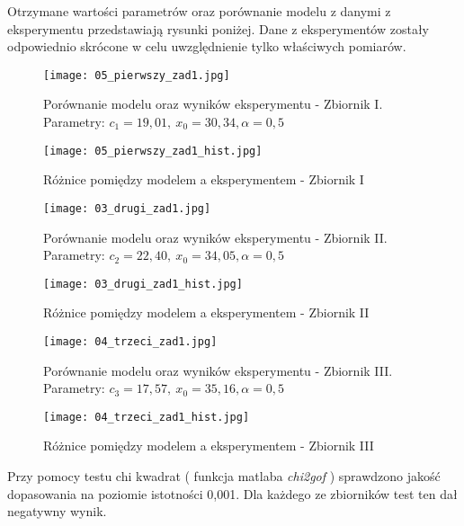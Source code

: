 \documentclass[a4paper,15pt]{article}
\begin{document}
Otrzymane wartości parametrów oraz porównanie modelu z danymi z eksperymentu przedstawiają rysunki poniżej. Dane z eksperymentów zostały odpowiednio skrócone w celu uwzględnienie tylko właściwych pomiarów.

\begin{figure}[H]
\centerline{\texttt{[image: 05\_pierwszy\_zad1.jpg]}}
\centering
\caption{Porównanie modelu oraz wyników eksperymentu - Zbiornik I. Parametry:
\( c_1 = 19,01, \ x_0 = 30,34, \alpha = 0,5 \)}
\label{fig:05_pierwszy_zad1}
\end{figure}

\begin{figure}[H]
\centerline{\texttt{[image: 05\_pierwszy\_zad1\_hist.jpg]}}
\centering
\caption{Różnice pomiędzy modelem a eksperymentem - Zbiornik I}
\label{fig:05_pierwszy_zad1_hist}
\end{figure}

\begin{figure}[H]
\centerline{\texttt{[image: 03\_drugi\_zad1.jpg]}}
\centering
\caption{Porównanie modelu oraz wyników eksperymentu - Zbiornik II. Parametry:
\( c_2 = 22,40, \ x_0 = 34,05, \alpha = 0,5 \)}
\label{fig:03_drugi_zad1}
\end{figure}

\begin{figure}[H]
\centerline{\texttt{[image: 03\_drugi\_zad1\_hist.jpg]}}
\centering
\caption{Różnice pomiędzy modelem a eksperymentem - Zbiornik II}
\label{fig:03_drugi_zad1_hist}
\end{figure}


\begin{figure}[H]
\centerline{\texttt{[image: 04\_trzeci\_zad1.jpg]}}
\centering
\caption{Porównanie modelu oraz wyników eksperymentu - Zbiornik III. Parametry:
\( c_3 = 17,57 , \ x_0 = 35,16, \alpha = 0,5 \)}
\label{fig:04_trzeci_zad1}
\end{figure}

\begin{figure}[H]
\centerline{\texttt{[image: 04\_trzeci\_zad1\_hist.jpg]}}
\centering
\caption{Różnice pomiędzy modelem a eksperymentem - Zbiornik III}
\label{fig:04_trzeci_zad1_hist}
\end{figure}

Przy pomocy testu chi kwadrat ( funkcja matlaba \textit{chi2gof} ) sprawdzono jakość dopasowania na poziomie istotności 0,001. Dla każdego ze zbiorników test ten dał negatywny wynik. 
\end{document}
